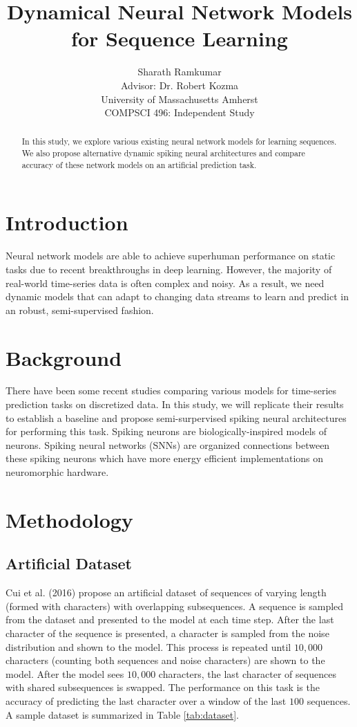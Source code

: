 \documentclass{article}
\title{Dynamical Neural Network Models\\for Sequence Learning}
\author{Sharath Ramkumar\\
Advisor: Dr. Robert Kozma\\University of Massachusetts Amherst\\COMPSCI 496: Independent Study}
\date{}
\begin{document}
\maketitle

\begin{abstract}
In this study, we explore various existing neural network models for learning sequences. We also propose alternative dynamic spiking neural architectures and compare accuracy of these network models on an artificial prediction task.
\end{abstract}

\section*{Introduction}

Neural network models are able to achieve superhuman performance on static tasks due to recent breakthroughs in deep learning. However, the majority of real-world time-series data is often complex and noisy. As a result, we need dynamic models that can adapt to changing data streams to learn and predict in an robust, semi-supervised fashion. 

\section*{Background}
There have been some recent studies comparing various models for time-series prediction tasks \cite{cui2016continuous} on discretized data. In this study, we will replicate their results to establish a baseline and propose semi-surpervised spiking neural architectures for performing this task. Spiking neurons \cite{gerstner2002spiking} are biologically-inspired models of neurons. Spiking neural networks (SNNs) \cite{maass1997networks} are organized connections between these spiking neurons which have more energy efficient \cite{cruz2012energy} implementations on neuromorphic hardware.

\section*{Methodology}

\subsection*{Artificial Dataset}

Cui et al. (2016) propose an artificial dataset of sequences of varying length (formed with characters) with overlapping subsequences. A sequence is sampled from the dataset and presented to the model at each time step. After the last character of the sequence is presented, a character is sampled from the noise distribution and shown to the model. This process is repeated until $10,000$ characters (counting both sequences and noise characters) are shown to the model. After the model sees $10,000$ characters, the last character of sequences with shared subsequences is swapped. The performance on this task is the accuracy of predicting the last character over a window of the last $100$ sequences. A sample dataset is summarized in Table \ref{tab:dataset}.
\end{document}
